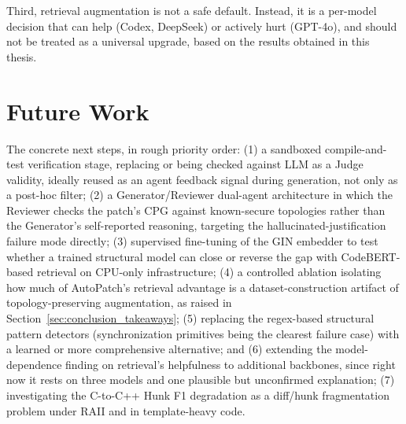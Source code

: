 Third, retrieval augmentation is not a safe default. Instead, it is a per-model decision that can help (Codex, DeepSeek) or actively hurt (GPT-4o), and should not be treated as a universal upgrade, based on the results obtained in this thesis.
 
 
\section{Future Work}
 
The concrete next steps, in rough priority order: (1) a sandboxed compile-and-test verification stage, replacing or being checked against LLM as a Judge validity, ideally reused as an agent feedback signal during generation, not only as a post-hoc filter; (2) a Generator/Reviewer dual-agent architecture in which the Reviewer checks the patch's CPG against known-secure topologies rather than the Generator's self-reported reasoning, targeting the hallucinated-justification failure mode directly; (3) supervised fine-tuning of the GIN embedder to test whether a trained structural model can close or reverse the gap with CodeBERT-based retrieval on CPU-only infrastructure; (4) a controlled ablation isolating how much of AutoPatch's retrieval advantage is a dataset-construction artifact of topology-preserving augmentation, as raised in Section~\ref{sec:conclusion_takeaways}; (5) replacing the regex-based structural pattern detectors (synchronization primitives being the clearest failure case) with a learned or more comprehensive alternative; and (6) extending the model-dependence finding on retrieval's helpfulness to additional backbones, since right now it rests on three models and one plausible but unconfirmed explanation; (7) investigating the C-to-C++ Hunk F1 degradation as a diff/hunk fragmentation problem under RAII and in template-heavy code. 

